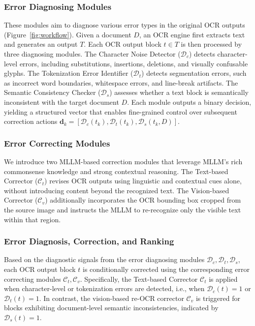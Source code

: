 \documentclass[11pt]{article}
\begin{document}
\subsubsection{Error Diagnosing Modules} 

These modules aim to diagnose various error types in the original OCR outputs (Figure~\ref{fig:workflow}). Given a document $D$, an OCR engine first extracts text and generates an output $T$. Each OCR output block $t \in T$ is then processed by three diagnosing modules. The Character Noise Detector ($\mathcal{D}_c$) detects character-level errors, including substitutions, insertions, deletions, and visually confusable glyphs. The Tokenization Error Identifier ($\mathcal{D}_t$) detects segmentation errors, such as incorrect word boundaries, whitespace errors, and line-break artifacts. The Semantic Consistency Checker ($\mathcal{D}_s$) assesses whether a text block is semantically inconsistent with the target document $D$. Each module outputs a binary decision, yielding a structured vector that enables fine-grained control over subsequent correction actions
$\mathbf{d}_k = [\mathcal{D}_c(t_k), \mathcal{D}_t(t_k), \mathcal{D}_s(t_k,D)]$.

\subsubsection{Error Correcting Modules}
We introduce two MLLM-based correction modules that leverage MLLM's rich commonsense knowledge and strong contextual reasoning.
The Text-based Corrector ($\mathcal{C}_t$) revises OCR outputs using linguistic and contextual cues alone, without introducing content beyond the recognized text. 
The Vision-based Corrector ($\mathcal{C}_v$) additionally incorporates the OCR bounding box cropped from the source image and instructs the MLLM to re-recognize only the visible text within that region.


\subsubsection{Error Diagnosis, Correction, and Ranking}

Based on the diagnostic signals from the error diagnosing modules ${\mathcal{D}_c,\mathcal{D}_t,\mathcal{D}_s}$, each OCR output block $t$ is conditionally corrected using the corresponding error correcting modules ${\mathcal{C}_t,\mathcal{C}_v}$.
Specifically, the Text-based Corrector $\mathcal{C}_t$ is applied when character-level or tokenization errors are detected, i.e., when $\mathcal{D}_c(t)=1$ or $\mathcal{D}_t(t)=1$. In contrast, the vision-based re-OCR corrector $\mathcal{C}_v$ is triggered for blocks exhibiting document-level semantic inconsistencies, indicated by $\mathcal{D}_s(t)=1$.
\end{document}
